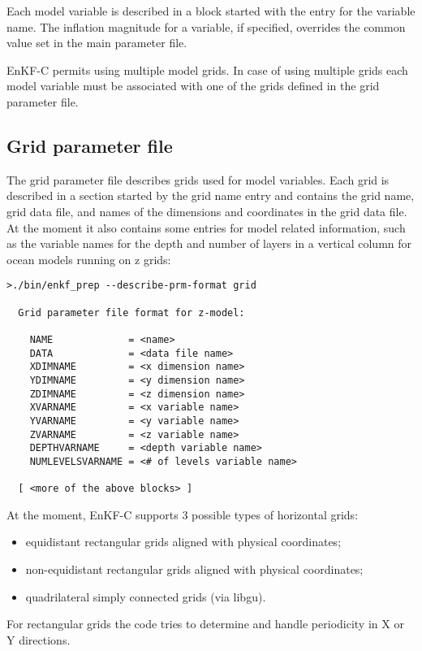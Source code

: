 \documentclass[11pt]{report}
\begin{document}
Each model variable is described in a block started with the entry for the variable name.
The inflation magnitude for a variable, if specified, overrides the common value set in the main parameter file.

EnKF-C permits using multiple model grids.
In case of using multiple grids each model variable must be associated with one of the grids defined in the grid parameter file.

\subsection{Grid parameter file}

The grid parameter file describes grids used for model variables.
Each grid is described in a section started by the grid name entry and contains the grid name, grid data file, and names of the dimensions and coordinates in the grid data file.
At the moment it also contains some entries for model related information, such as the variable names for the depth and number of layers in a vertical column for ocean models running on z grids:
\begin{Verbatim}[frame=single,fontsize=\footnotesize]
>./bin/enkf_prep --describe-prm-format grid

  Grid parameter file format for z-model:

    NAME             = <name>
    DATA             = <data file name>
    XDIMNAME         = <x dimension name>
    YDIMNAME         = <y dimension name>
    ZDIMNAME         = <z dimension name>
    XVARNAME         = <x variable name>
    YVARNAME         = <y variable name>
    ZVARNAME         = <z variable name>
    DEPTHVARNAME     = <depth variable name>
    NUMLEVELSVARNAME = <# of levels variable name>

  [ <more of the above blocks> ]
\end{Verbatim}

At the moment, EnKF-C supports 3 possible types of horizontal grids:
\begin{itemize}
\item equidistant rectangular grids aligned with physical coordinates;
\item non-equidistant rectangular grids aligned with physical coordinates;
\item quadrilateral simply connected grids (via libgu).
\end{itemize}
For rectangular grids the code tries to determine and handle periodicity in X or Y directions.
\end{document}
